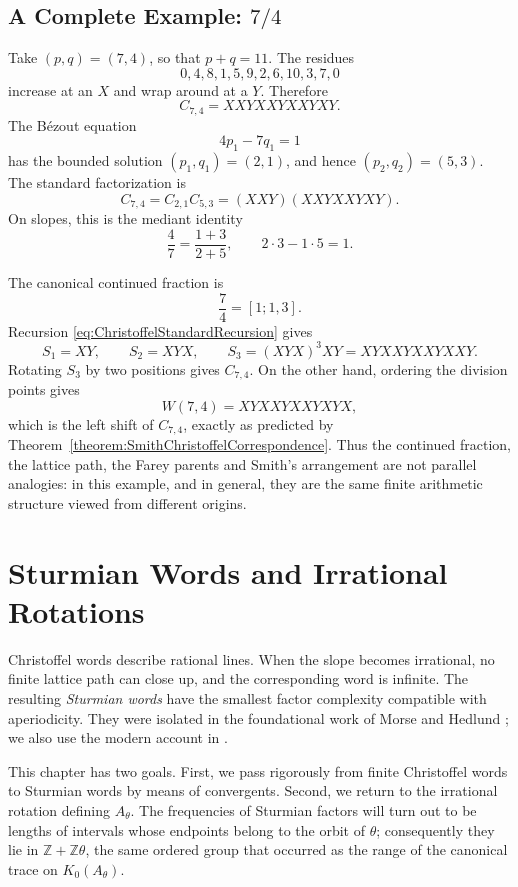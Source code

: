 \documentclass{book}
\begin{document}
\section{A Complete Example: \texorpdfstring{\(7/4\)}{7/4}}

Take \((p,q)=(7,4)\), so that \(p+q=11\).  The residues
\[
  0,4,8,1,5,9,2,6,10,3,7,0
\]
increase at an \(X\) and wrap around at a \(Y\).  Therefore
\[
  C_{7,4}=XXYXXYXXYXY.
\]
The B\'ezout equation
\[
  4p_1-7q_1=1
\]
has the bounded solution \((p_1,q_1)=(2,1)\), and hence
\((p_2,q_2)=(5,3)\).  The standard factorization is
\[
  C_{7,4}=C_{2,1}C_{5,3}
  =(XXY)(XXYXXYXY).
\]
On slopes, this is the mediant identity
\[
  \frac47=\frac{1+3}{2+5},
  \qquad 2\cdot3-1\cdot5=1.
\]

The canonical continued fraction is
\[
  \frac74=[1;1,3].
\]
Recursion \eqref{eq:ChristoffelStandardRecursion} gives
\[
  S_1=XY,\qquad S_2=XYX,\qquad
  S_3=(XYX)^3XY=XYXXYXXYXXY.
\]
Rotating \(S_3\) by two positions gives \(C_{7,4}\).  On the other hand,
ordering the division points gives
\[
  W(7,4)=XYXXYXXYXYX,
\]
which is the left shift of \(C_{7,4}\), exactly as predicted by
Theorem~\ref{theorem:SmithChristoffelCorrespondence}.  Thus the continued
fraction, the lattice path, the Farey parents and Smith's arrangement are
not parallel analogies: in this example, and in general, they are the same
finite arithmetic structure viewed from different origins.

\chapter{Sturmian Words and Irrational Rotations}

Christoffel words describe rational lines.  When the slope becomes
irrational, no finite lattice path can close up, and the corresponding word
is infinite.  The resulting \emph{Sturmian words} have the smallest factor
complexity compatible with aperiodicity.  They were isolated in the
foundational work of Morse and Hedlund \cite{MorseHedlund1940}; we also use
the modern account in \cite[Chapter~2]{Lothaire2002}.

This chapter has two goals.  First, we pass rigorously from finite
Christoffel words to Sturmian words by means of convergents.  Second, we
return to the irrational rotation defining \(A_\theta\).  The frequencies
of Sturmian factors will turn out to be lengths of intervals whose endpoints
belong to the orbit of \(\theta\); consequently they lie in
\(\mathbb Z+\mathbb Z\theta\), the same ordered group that occurred as the
range of the canonical trace on \(K_0(A_\theta)\).
\end{document}
